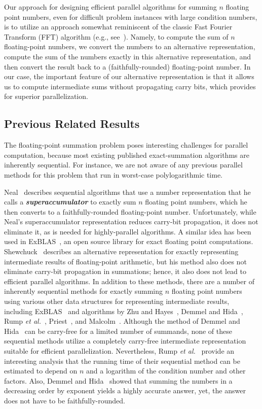 \documentclass[11pt]{article}
\renewcommand{\emph}[1]{\textit{\textbf{#1}}}
\begin{document}
Our approach for designing efficient parallel algorithms for summing
$n$ floating point numbers, even for difficult problem instances
with large condition numbers, is to utilize an approach 
somewhat reminiscent of the classic Fast Fourier Transform
(FFT) algorithm (e.g., see~\cite{Brigham,GoodrichADA}).
Namely, to compute the sum of $n$ floating-point 
numbers, we convert the numbers to an 
alternative representation, compute the sum of the numbers exactly in
this alternative representation, and then convert the result back to
a (faithfully-rounded) floating-point number.
In our case, the important feature of our alternative representation
is that it allows us to compute intermediate sums without 
propagating carry bits, which provides for superior parallelization.

\subsection{Previous Related Results}
The floating-point summation problem 
poses interesting challenges for parallel computation, because most existing
published exact-summation algorithms are inherently sequential.
For instance, we are not aware of any previous parallel methods
for this problem
that run in worst-case polylogarithmic time.

Neal~\cite{Neal15a} describes sequential algorithms that use a number
representation that he calls a \emph{superaccumulator} to exactly
sum $n$ floating point numbers, which he then converts 
to a faithfully-rounded floating-point number.
Unfortunately, while Neal's superaccumulator representation
reduces carry-bit propagation, it does not eliminate it, as is needed 
for highly-parallel algorithms.
A similar idea has been used in ExBLAS~\cite{CDG+14}, an open source
library for exact floating point computations.
Shewchuck~\cite{shewchuk} describes an alternative
representation for exactly representing intermediate results of
floating-point arithmetic, but his method also does not eliminate
carry-bit propagation in summations; hence, it also does not lead to
efficient parallel algorithms.
In addition to these methods, there are a number of inherently
sequential methods for exactly summing $n$ floating point numbers
using various other data structures for representing intermediate results,
including 
ExBLAS~\cite{CDG+14} and algorithms by 
Zhu and Hayes~\cite{doi:10.1137/070710020,Zhu:2010:A9O},
Demmel and Hida~\cite{doi:10.1137/S1064827502407627,demmel},
Rump {\it et al.}~\cite{doi:10.1137/050645671},
Priest~\cite{p145549},
and Malcolm~\cite{Malcolm:1971}.
Although the method of Demmel and Hida~\cite{demmel} can be
carry-free for a limited number of summands,
none of these sequential methods utilize a completely carry-free intermediate
representation suitable for efficient parallelization.
Nevertheless, Rump {\it et al.}~\cite{doi:10.1137/050645671} provide
an interesting analysis that the running
time of their sequential method 
can be estimated to depend on $n$ and a logarithm 
of the condition number and other factors.
Also, Demmel and Hida~\cite{demmel} showed that summing the numbers
in a decreasing order by exponent yields a highly accurate answer,
yet, the answer does not have to be faithfully-rounded.
\end{document}

